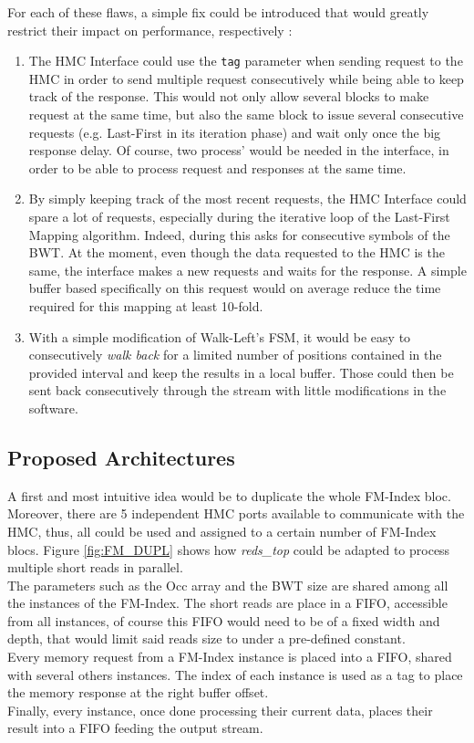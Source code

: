 For each of these flaws, a simple fix could be introduced that would greatly restrict their impact on performance, respectively :

\begin{enumerate}
    \item The HMC Interface could use the \texttt{tag} parameter when sending request to the HMC in order to send multiple request consecutively while being able to keep track of the response. This would not only allow several blocks to make request at the same time, but also the same block to issue several consecutive requests (e.g. Last-First in its iteration phase) and wait only once the big response delay. Of course, two process' would be needed in the interface, in order to be able to process request and responses at the same time.
    \item By simply keeping track of the most recent requests, the HMC Interface could spare a lot of requests, especially during the iterative loop of the Last-First Mapping algorithm. Indeed, during this asks for consecutive symbols of the BWT. At the moment, even though the data requested to the HMC is the same, the interface makes a new requests and waits for the response. A simple buffer based specifically on this request would on average reduce the time required for this mapping at least 10-fold.
    \item With a simple modification of Walk-Left's FSM, it would be easy to consecutively \textit{walk back} for a limited number of positions contained in the provided interval and keep the results in a local buffer. Those could then be sent back consecutively through the stream with little modifications in the software.
\end{enumerate}

\subsection{Proposed Architectures}

A first and most intuitive idea would be to duplicate the whole FM-Index bloc. Moreover, there are 5 independent HMC ports available to communicate with the HMC, thus, all could be used and assigned to a certain number of FM-Index blocs. Figure \ref{fig:FM_DUPL} shows how \textit{reds\_top} could be adapted to process multiple short reads in parallel. \\
The parameters such as the Occ array and the BWT size are shared among all the instances of the FM-Index. The short reads are place in a FIFO, accessible from all instances, of course this FIFO would need to be of a fixed width and depth, that would limit said reads size to under a pre-defined constant. \\
Every memory request from a FM-Index instance is placed into a FIFO, shared with several others instances. The index of each instance is used as a tag to place the memory response at the right buffer offset. \\
Finally, every instance, once done processing their current data, places their result into a FIFO feeding the output stream. 

